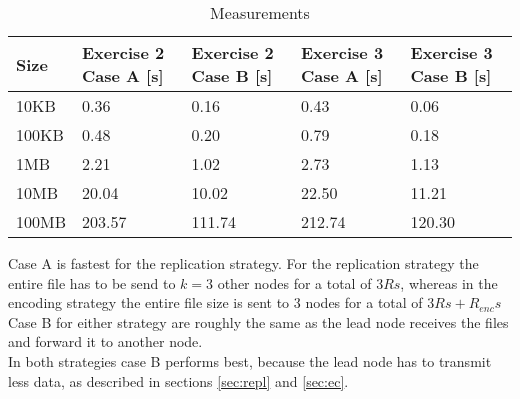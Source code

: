 \begin{table}[H]
    \begin{tabularx}{\textwidth}{|X|X|X|X|X|}
        \hline
        \cellcolor{lightgray}\textbf{Size} & \cellcolor{lightgray}\textbf{Exercise 2 Case A [s]} & \cellcolor{lightgray}\textbf{Exercise 2 Case B [s]} & \cellcolor{lightgray}\textbf{Exercise 3 Case A [s]} & \cellcolor{lightgray}\textbf{Exercise 3 Case B [s]}  \\\hline
        10KB  & 0.36    & 0.16   & 0.43   & 0.06   \\\hline
        100KB & 0.48    & 0.20   & 0.79   & 0.18   \\\hline
        1MB   & 2.21    & 1.02   & 2.73   & 1.13   \\\hline
        10MB  & 20.04   & 10.02  & 22.50  & 11.21  \\\hline
        100MB & 203.57  & 111.74 & 212.74 & 120.30 \\\hline
    \end{tabularx}
    \caption{Measurements}
	\label{tab:e2meas}
\end{table}

Case A is fastest for the replication strategy. For the replication strategy the entire file has to be send to $k=3$ other nodes for a total of $3Rs$, whereas in the encoding strategy the entire file size is sent to 3 nodes for a total of $3Rs + R_{enc}s$ \\
Case B for either strategy are roughly the same as the lead node receives the files and forward it to another node. \\
In both strategies case B performs best, because the lead node has to transmit less data, as described in sections \ref{sec:repl} and \ref{sec:ec}.